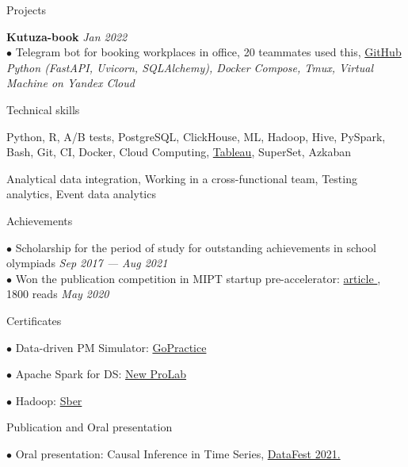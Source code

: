 \documentclass{resume} %
\begin{document}
\begin{rSection}{ Projects }

    { \bf Kutuza-book} \hfill {\em Jan 2022}\\
    { $\bullet$ Telegram bot for booking workplaces in office, 20 teammates used this, \href{https://github.com/YHx07/Kutuza-book}{GitHub}}\\
    { \it Python (FastAPI, Uvicorn, SQLAlchemy), Docker Compose, Tmux, Virtual Machine on Yandex Cloud }
    
\end{rSection}
    
\begin{rSection}{ Technical skills }
    
    Python, R, A/B tests, PostgreSQL, ClickHouse, ML, Hadoop, Hive, PySpark, Bash, Git, CI, Docker, Cloud Computing, \href{https://public.tableau.com/profile/dmitriy5983#!/}{Tableau}, SuperSet, Azkaban
    
    Analytical data integration, Working in a cross-functional team, Testing analytics, Event data analytics 

\end{rSection}

\begin{rSection}{ Achievements }

    { $\bullet$ Scholarship for the period of study for outstanding achievements in school olympiads } \hfill {\em Sep 2017 — Aug 2021}\\
    { $\bullet$ Won the publication competition in MIPT startup pre-accelerator: \href{https://vc.ru/tribuna/125433-kak-my-hoteli-pomoch-taksistam-no-pandemiya-vse-isportila}{ article }, 1800 reads }\hfill {\em May 2020}

\end{rSection}

\begin{rSection}{ Certificates }
    
    \begin{multicols}{2}[]
    
    $\bullet$ Data-driven PM Simulator: \href{https://gopractice.ru/course/pm/certificate/juqpip7o}{GoPractice}
    
    $\bullet$ Apache Spark for DS: \href{https://cloud.mail.ru/public/SQAS/RrvheyFmY}{New ProLab} 
    
    $\bullet$ Hadoop: \href{https://cloud.mail.ru/public/CH8T/6mMgjbRMZ}{Sber}
    
    \end{multicols}

\end{rSection}

\begin{rSection}{ Publication and Oral presentation }

    { $\bullet$ Oral presentation: Causal Inference in Time Series, \href{https://youtu.be/Yr6b8Rpy7Ds}{DataFest 2021. }}\\
    
\end{rSection}
\end{document}
